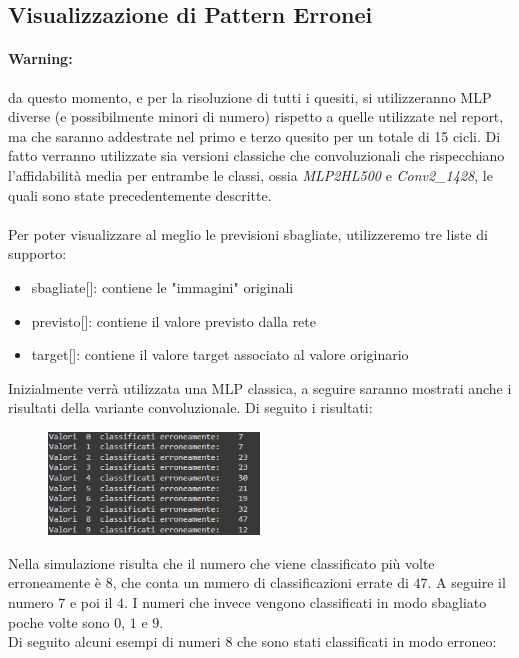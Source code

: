 \documentclass[12pt, a4paper]{article}
\begin{document}
\subsection{Visualizzazione di Pattern Erronei}
\paragraph{Warning:} da questo momento, e per la risoluzione di tutti i quesiti, si utilizzeranno MLP diverse (e possibilmente minori di numero) rispetto a quelle utilizzate nel report, ma che saranno addestrate nel primo e terzo quesito per un totale di 15 cicli. Di fatto verranno utilizzate sia versioni classiche che convoluzionali che rispecchiano l'affidabilità media per entrambe le classi, ossia \textit{MLP2HL500} e \textit{Conv2\_1428}, le quali sono state precedentemente descritte. \\\\ 
Per poter visualizzare al meglio le previsioni sbagliate, utilizzeremo tre liste di supporto:
\begin{itemize}
    \item sbagliate[]: contiene le "immagini" originali
    \item previsto[]: contiene il valore previsto dalla rete
    \item target[]: contiene il valore target associato al valore originario
\end{itemize}

Inizialmente verrà utilizzata una MLP classica, a seguire saranno mostrati anche i risultati della variante convoluzionale.
Di seguito i risultati:
\begin{figure}[H]
    \centering
    \includegraphics[width=0.50\textwidth]{ErrateClassica.png}
\end{figure}

Nella simulazione risulta che il numero che viene classificato più volte erroneamente è \(8\), che conta un numero di classificazioni errate di \(47\). A seguire il numero \(7\) e poi il \(4\). I numeri che invece vengono classificati in modo sbagliato poche volte sono \(0\), \(1\) e \(9\).\\
Di seguito alcuni esempi di numeri \(8\) che sono stati classificati in modo erroneo:
\end{document}

